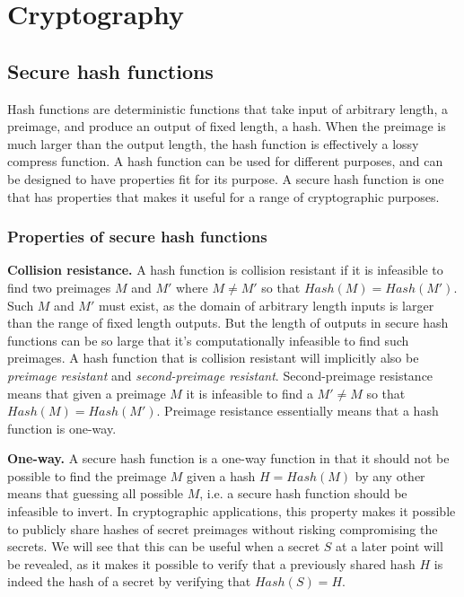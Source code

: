 \section{Cryptography}
\label{sec:cryptography}

\subsection{Secure hash functions}

Hash functions are deterministic functions that take input of arbitrary length, a preimage, and produce an output of fixed length, a hash. When the preimage is much larger than the output length, the hash function is effectively a lossy compress function. A hash function can be used for different purposes, and can be designed to have properties fit for its purpose. A secure hash function is one that has properties that makes it useful for a range of cryptographic purposes. 

\subsubsection{Properties of secure hash functions}

{\bf Collision resistance.}
A hash function is collision resistant if it is infeasible to find two preimages $M$ and $M'$ where $M \neq M'$ so that $Hash(M) = Hash(M')$. Such $M$ and $M'$ must exist, as the domain of arbitrary length inputs is larger than the range of fixed length outputs. But the length of outputs in secure hash functions can be so large that it's computationally infeasible to find such preimages. 
A hash function that is collision resistant will implicitly also be \emph{preimage resistant} and \emph{second-preimage resistant}. Second-preimage resistance means that given a preimage $M$ it is infeasible to find a $M' \neq M$ so that $Hash(M) = Hash(M')$. Preimage resistance essentially means that a hash function is one-way.

{\bf One-way.}
A secure hash function is a one-way function in that it should not be possible to find the preimage $M$ given a hash $H = Hash(M)$ by any other means that guessing all possible $M$, i.e. a secure hash function should be infeasible to invert. In cryptographic applications, this property makes it possible to publicly share hashes of secret preimages without risking compromising the secrets. We will see that this can be useful when a secret $S$ at a later point will be revealed, as it makes it possible to verify that a previously shared hash $H$ is indeed the hash of a secret by verifying that $Hash(S) = H$.

